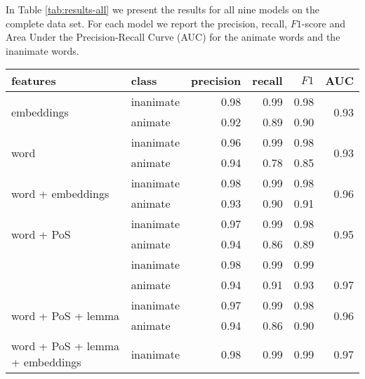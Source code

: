 \documentclass[a4paper,UKenglish]{oasics}
\begin{document}
In Table \ref{tab:results-all} we present the results for all nine
models on the complete data set. For each model we report the
precision, recall, $F1$-score and Area Under the Precision-Recall
Curve (AUC) for the animate words and the
inanimate words.

\begin{table}
\centering
\begin{tabular}{llrrrr}
\toprule
features & class & precision &  recall & $F1$ &  AUC \\
\midrule
\multirow{2}{*}{embeddings}                            & inanimate     &       0.98 &    0.99 &    0.98 & \multirow{2}{*}{0.93} \\
                                                       & animate     &       0.92 &    0.89 &    0.90 &  \\
\multirow{2}{*}{word}                                  & inanimate     &       0.96 &    0.99 &    0.98 & \multirow{2}{*}{0.93} \\
                                                       & animate     &       0.94 &    0.78 &    0.85 &  \\
\multirow{2}{*}{word + embeddings}                     & inanimate     &       0.98 &    0.99 &    0.98 & \multirow{2}{*}{0.96} \\
                                                       & animate     &       0.93 &    0.90 &    0.91 &  \\
\multirow{2}{*}{word + PoS}                            & inanimate     &       0.97 &    0.99 &    0.98 & \multirow{2}{*}{0.95} \\
                                                       & animate     &       0.94 &    0.86 &    0.89 &  \\
\rowcolor{Gray}                                        & inanimate     &       0.98 &    0.99 &    0.99 &  \\
\rowcolor{Gray}\multirow{-2}{*}{word + PoS + embeddings}   & animate     &       0.94 &    0.91 &    0.93 & \multirow{-2}{*}{0.97} \\
\multirow{2}{*}{word + PoS + lemma}                    & inanimate    &       0.97 &    0.99 &    0.98 & \multirow{2}{*}{0.96} \\
                                                       & animate     &       0.94 &    0.86 &    0.90 &  \\
\multirow{2}{*}{word + PoS + lemma + embeddings}       & inanimate     &       0.98 &    0.99 &    0.99 & \multirow{2}{*}{0.97} \\

\end{tabular}
\end{table}
\end{document}

